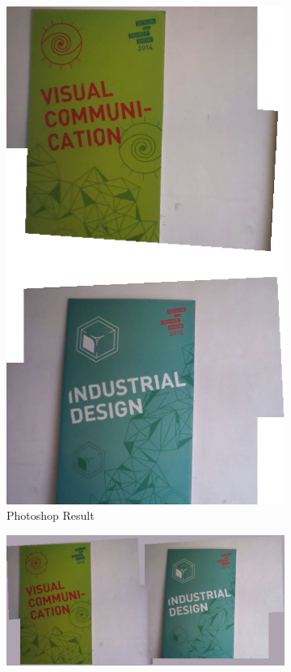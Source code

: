 \begin{figure}
\begin{subfigure}[b]{0.3\textwidth}
\includegraphics[width=\linewidth]{figures/idc_indoor/photoshop.jpg}
\caption{Photoshop Result}
\end{subfigure}
\begin{subfigure}[b]{0.3\textwidth}
\includegraphics[width=\linewidth]{figures/idc_indoor/our_result.jpg}

\end{subfigure}
\end{figure}
